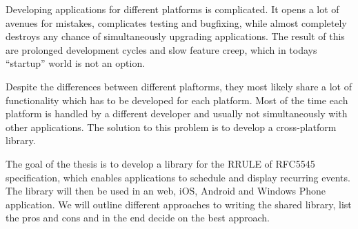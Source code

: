 \begin{Abstract}

Developing applications for different platforms is complicated. It opens a lot of avenues for mistakes, complicates testing and bugfixing, while almost completely destroys any chance of simultaneously upgrading applications. The result of this are prolonged development cycles and slow feature creep, which in todays ``startup'' world is not an option.

Despite the differences between different plaftorms, they most likely share a lot of functionality which has to be developed for each platform. Most of the time each platform is handled by a different developer and usually not simultaneously with other applications. The solution to this problem is to develop a cross-platform library.

The goal of the thesis is to develop a library for the RRULE of RFC5545 specification, which enables applications to schedule and display recurring events. The library will then be used in an web, iOS, Android and Windows Phone application. We will outline different approaches to writing the shared library, list the pros and cons and in the end decide on the best approach.
\end{Abstract}
